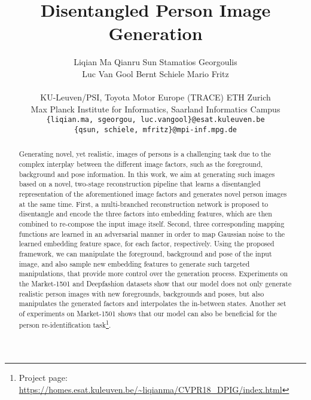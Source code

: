\documentclass[10pt,twocolumn,letterpaper]{article}
\begin{document}
\pagestyle{plain}
\title{Disentangled Person Image Generation}

\author{Liqian Ma \quad Qianru Sun \quad Stamatios Georgoulis \\ 
Luc Van Gool \quad Bernt Schiele  \quad Mario Fritz \\
\\
KU-Leuven/PSI, Toyota Motor Europe (TRACE) \quad  ETH Zurich \\
  Max Planck Institute for Informatics, Saarland Informatics Campus \\
  {\texttt{\{liqian.ma, sgeorgou,
luc.vangool\}@esat.kuleuven.be}} \\
{\texttt{\{qsun, schiele, mfritz\}@mpi-inf.mpg.de}} 
}

\maketitle
\thispagestyle{empty}

\begin{abstract}
Generating novel, yet realistic, images of persons is a challenging task due to the complex interplay between the different image factors, such as the foreground, background and pose information. In this work, we aim at generating such images based on a novel, two-stage reconstruction pipeline that learns a disentangled representation of the aforementioned image factors and generates novel person images at the same time. First, a multi-branched reconstruction network is proposed to disentangle and encode the three factors into embedding features, which are then combined to re-compose the input image itself. Second, three corresponding mapping functions are learned in an adversarial manner in order to map Gaussian noise to the learned embedding feature space, for each factor, respectively. Using the proposed framework, we can manipulate the foreground, background and pose of the input image, and also sample new embedding features to generate such targeted manipulations, that provide more control over the generation process. Experiments on the Market-1501 and Deepfashion datasets show that our model does not only generate realistic person images with new foregrounds, backgrounds and poses, but also manipulates the generated factors and interpolates the in-between states. Another set of experiments on Market-1501 shows that our model can also be beneficial for the person re-identification task\footnote{Project page: \url{https://homes.esat.kuleuven.be/~liqianma/CVPR18_DPIG/index.html}}.
\end{abstract}
\end{document}

